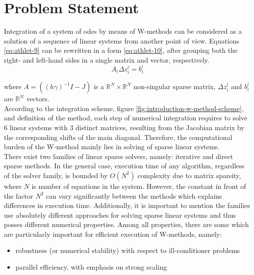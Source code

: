 \chapter{Problem Statement}\label{chapter:problem-statment}


Integration of a system of \gls{ode}s by means of W-methods can be considered as a solution of a sequence of linear systems from another point of view. Equations \ref{eq:athlet-9} can be rewritten in a form \ref{eq:athlet-10}, after grouping both the right- and left-hand sides in a single matrix and vector, respectively.\\


\begin{equation} \label{eq:athlet-10}
	A_{i} \Delta z^{l}_{i} =  b^{l}_{i} 
\end{equation}

where $A = ((h \gamma)^{-1}I - J)$ is a $\mathbb{R}^{N} \times \mathbb{R}^{N}$ non-singular sparse matrix, $\Delta z^{l}_{i}$  and $b^{l}_{i}$ are $\mathbb{R}^{N}$ vectors.\\


According to the integration scheme, figure \ref{fig:introduction-w-method-scheme}, and definition of the method, each step of numerical integration requires to solve 6 linear systems with 3 distinct matrices, resulting from the Jacobian matrix by the corresponding shifts of the main diagonal. Therefore, the computational burden of the W-method mainly lies in solving of sparse linear systems.\\


There exist two families of linear sparse solvers, namely: iterative and direct sparse methods. In the general case, execution time of any algorithm, regardless of the solver family, is bounded by $O(N^2)$ complexity due to matrix sparsity, where $N$ is number of equations in the system. However, the constant in front of the factor $N^2$ can vary significantly between the methods which explains differences in execution time. Additionally, it is important to mention the families use absolutely different approaches for solving sparse linear systems and thus posses different numerical properties. Among all  properties, there are some which are particularly important for efficient execution of W-methods, namely: \\


\begin{itemize}
	\item robustness (or numerical stability) with respect to ill-conditioner problems
	\item parallel efficiency, with emphasis on strong scaling 
\end{itemize}


